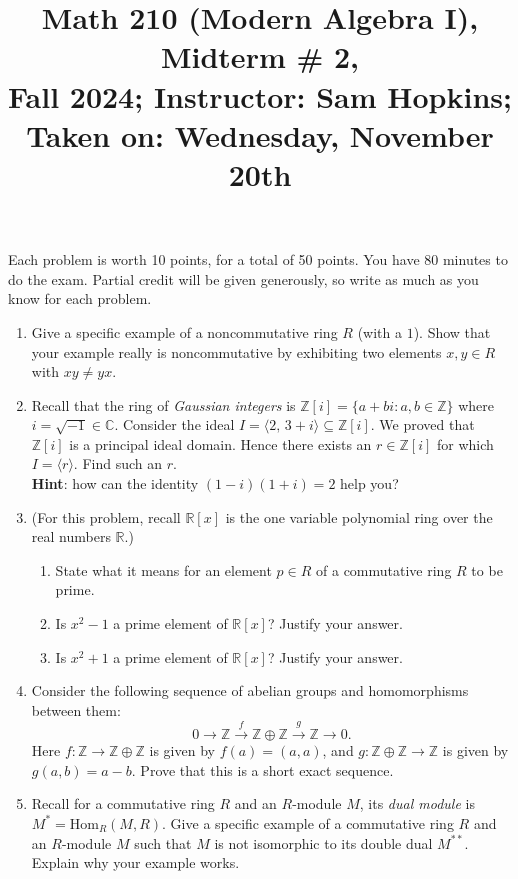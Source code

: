 \documentclass[11pt]{article}
\title{Math 210 (Modern Algebra I), Midterm \# 2, \\ {\normalsize Fall 2024; Instructor: Sam Hopkins; Taken on: Wednesday, November 20th}}
\date{}
\begin{document}
\maketitle

Each problem is worth 10 points, for a total of 50 points. You have 80 minutes to do the exam. Partial credit will be given generously, so write as much as you know for each problem.

\thispagestyle{empty}
\begin{enumerate}

\item Give a specific example of a noncommutative ring $R$ (with a $1$). Show that your example really is noncommutative by exhibiting two elements $x,y \in R$ with $xy \neq yx$.

\item Recall that the ring of \emph{Gaussian integers} is $\mathbb{Z}[i] = \{a+bi\colon a,b\in \mathbb{Z}\}$ where $i=\sqrt{-1} \in \mathbb{C}$. Consider the ideal $I = \langle 2, \, 3+i \rangle \subseteq \mathbb{Z}[i]$. We proved that $\mathbb{Z}[i]$ is a principal ideal domain. Hence there exists an $r \in \mathbb{Z}[i]$ for which $I = \langle r \rangle$. Find such an $r$. \\{\bf Hint}: how can the identity $(1-i)(1+i)=2$ help you?

\item (For this problem, recall $\mathbb{R}[x]$ is the one variable polynomial ring over the real numbers $\mathbb{R}$.)
\begin{enumerate}
\item State what it means for an element $p \in R$ of a commutative ring $R$ to be prime.
\item Is $x^2-1$ a prime element of $\mathbb{R}[x]$? Justify your answer.
\item Is $x^2+1$ a prime element of $\mathbb{R}[x]$? Justify your answer.
\end{enumerate}

\item Consider the following sequence of abelian groups and homomorphisms between them:
\[ 0 \to \mathbb{Z} \xrightarrow{f} \mathbb{Z} \oplus \mathbb{Z} \xrightarrow{g} \mathbb{Z} \to 0.\]
Here $f\colon \mathbb{Z} \to \mathbb{Z} \oplus \mathbb{Z}$ is given by $f(a) = (a,a)$, and $g\colon \mathbb{Z} \oplus \mathbb{Z} \to \mathbb{Z}$ is given by $g(a,b) = a-b$. Prove that this is a short exact sequence.

\item Recall for a commutative ring $R$ and an $R$-module $M$, its \emph{dual module} is $M^* = \mathrm{Hom}_R(M,R)$. Give a specific example of a commutative ring $R$ and an $R$-module $M$ such that $M$ is not isomorphic to its double dual $M^{**}$. Explain why your example works.

\end{enumerate}
\end{document}
